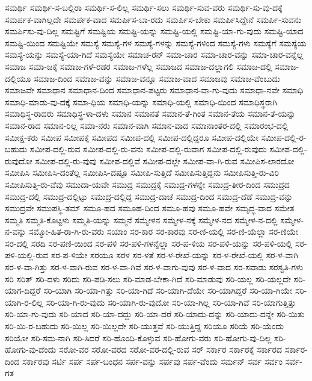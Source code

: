 {ಸಮರ್ಥಿ
ಸಮರ್ಥಿ-ಸ-ಬಲ್ಲಿರಾ
ಸಮರ್ಥಿ-ಸ-ಲಿಲ್ಲ
ಸಮರ್ಥಿ-ಸಲು
ಸಮರ್ಥಿ-ಸುವ-ವರು
ಸಮರ್ಥಿ-ಸು-ವು-ದಕ್ಕೆ
ಸಮರ್ಪಕ-ವಾಗಿಲ್ಲದೇ
ಸಮರ್ಪಕ-ವಾದ
ಸಮರ್ಪಿಸ-ಬಾ-ರದು
ಸಮರ್ಪಿಸ-ಬೇಕು
ಸಮರ್ಪಿಸಿದ್ದೇನೆ
ಸಮರ್ಪಿ-ಸುವನು
ಸಮರ್ಪಿಸು-ವು-ದಿಲ್ಲ
ಸಮಷ್ಟಿಗೆ
ಸಮಷ್ಟಿಯ
ಸಮಷ್ಟಿ-ಯನ್ನು
ಸಮಷ್ಟಿ-ಯಲ್ಲಿ
ಸಮಷ್ಟಿ-ಯಾ-ಗು-ವುದು
ಸಮಷ್ಟಿ-ಯಾದ
ಸಮಷ್ಟಿ-ಯಿಂದ
ಸಮಷ್ಟಿಯೇ
ಸಮಸ್ಯೆ
ಸಮಸ್ಯೆ-ಗಳ
ಸಮಸ್ಯೆ-ಗಳನ್ನು
ಸಮಸ್ಯೆ-ಗಳಿಂದ
ಸಮಸ್ಯೆ-ಗಳು
ಸಮಸ್ಯೆಗೆ
ಸಮಸ್ಯೆಯ
ಸಮಸ್ಯೆ-ಯನ್ನು
ಸಮಸ್ಯೆ-ಯಾ-ಗಿದೆ
ಸಮಸ್ಯೆಯೇ
ಸಮಾಚ-ರನ್
ಸಮಾ-ಚಾರ
ಸಮಾ-ಚಾರ-ವನ್ನು
ಸಮಾ-ಚಾರ-ವನ್ನೆಲ್ಲ
ಸಮಾಜ
ಸಮಾ-ಜಕ್ಕೆ
ಸಮಾಜ-ಗಳೆ-ರಡರ
ಸಮಾಜ-ಗಳೆಲ್ಲ
ಸಮಾಜದ
ಸಮಾಜ-ದಲ್ಲಾಗಲಿ
ಸಮಾಜ-ದಲ್ಲಿ
ಸಮಾಜ-ದಲ್ಲಿಯೂ
ಸಮಾಜ-ದಿಂದ
ಸಮಾಜ-ವನ್ನು
ಸಮಾಜ-ವನ್ನೂ
ಸಮಾಜ-ವಾದ
ಸಮಾಜವು
ಸಮಾಜ-ವೆಂಬುದು
ಸಮಾಜವೇ
ಸಮಾಧಾನ
ಸಮಾಧಾನ-ದಿಂದ
ಸಮಾಧಾನ-ಪಟ್ಟರು
ಸಮಾಧಾನ-ವಾ-ಗು-ವುದು
ಸಮಾಧಾ-ನವೇ
ಸಮಾಧಿ
ಸಮಾಧಿ-ಮಾಡು-ವು-ದಕ್ಕೆ
ಸಮಾ-ಧಿಯ
ಸಮಾಧಿ-ಯನ್ನು
ಸಮಾಧಿ-ಯಲ್ಲಿ
ಸಮಾಧಿ-ಯಿಂದ
ಸಮಾಧಿಸ್ಥರಾಗಿ
ಸಮಾಧಿಸ್ಥ-ರಾದರು
ಸಮಾಧಿಸ್ಥ-ಳಾ-ದಳು
ಸಮಾನ
ಸಮಾನತೆ
ಸಮಾನ-ತೆ-ಗಿಂತ
ಸಮಾನ-ತೆಯ
ಸಮಾನ-ತೆ-ಯನ್ನು
ಸಮಾನ-ರಾದ
ಸಮಾನ-ರಿಲ್ಲ
ಸಮಾ-ನರು
ಸಮಾನ-ವಾಗಿ
ಸಮಾನ-ವಾದ
ಸಮಾನಾಂತರ-ದಲ್ಲಿ
ಸಮಾರಂಭ-ದಲ್ಲಿ
ಸಮೀಕ್ಷ-ಕರು
ಸಮೀಪ
ಸಮೀಪಕ್ಕೆ
ಸಮೀಪದ
ಸಮೀಪ-ದಲ್ಲಿ
ಸಮೀಪ-ದಲ್ಲಿದ್ದರೂ
ಸಮೀಪ-ದಲ್ಲಿಯೇ
ಸಮೀಪ-ದಲ್ಲಿ-ರ-ಬಹುದು
ಸಮೀಪ-ದಲ್ಲಿ-ರುವ
ಸಮೀಪ-ದಲ್ಲಿ-ರು-ವನು
ಸಮೀಪ-ದಲ್ಲಿ-ರುವಾಗ
ಸಮೀಪ-ದಲ್ಲಿ-ರುವುದು
ಸಮೀಪ-ದಲ್ಲಿ-ರುವುದೋ
ಸಮೀಪ-ದಲ್ಲಿ-ರು-ವುವು
ಸಮೀಪ-ದಲ್ಲಿವೆ
ಸಮೀಪ-ದಲ್ಲೇ
ಸಮೀಪ-ವಾ-ಗಿ-ರುವ
ಸಮೀಪಿಸ-ಲಾರದೋ
ಸಮೀಪಿಸಿ
ಸಮೀಪಿಸಿ-ದಂತೆಲ್ಲ
ಸಮೀಪಿಸಿ-ದಷ್ಟೂ
ಸಮೀಪಿ-ಸುತ್ತಿದೆ
ಸಮೀಪಿಸುತ್ತಿದ್ದನು
ಸಮೀಪಿಸುತ್ತಿ-ರು-ವಿರಿ
ಸಮೀಪಿಸುತ್ತಿ-ರು-ವೆವು
ಸಮುದಾ-ಯವೇ
ಸಮುದ್ರ
ಸಮುದ್ರಕ್ಕೆ
ಸಮುದ್ರ-ಗಳನ್ನೇ
ಸಮುದ್ರ-ತೀರ-ದಿಂದ
ಸಮುದ್ರದ
ಸಮುದ್ರ-ದಲ್ಲಿ
ಸಮುದ್ರ-ದಲ್ಲಿಟ್ಟು
ಸಮುದ್ರ-ದಲ್ಲಿದ್ದ
ಸಮುದ್ರ-ದಾಚೆ
ಸಮುದ್ರ-ದಿಂದ
ಸಮುದ್ರ-ದೆಡೆ
ಸಮುದ್ರ-ವನ್ನು
ಸಮುದ್ರವೇ
ಸಮುಪಸ್ಥಿ-ತಮ್
ಸಮೂ-ಹದ
ಸಮೂಹ-ದಿಂದ
ಸಮೂ-ಹವು
ಸಮೂ-ಹವೇ
ಸಮೃದ್ಧ-ವಾದ
ಸಮೇತ
ಸಮ್ಮತಿ
ಸಮ್ಮತಿ-ಕೊಟ್ಟಳು
ಸಮ್ಮತಿ-ಯನ್ನು
ಸಮ್ಮನೆ
ಸಮ್ಮೇಳನ
ಸಮ್ಮೇಳ-ನಕ್ಕೆ
ಸಮ್ಮೇಳ-ನದ
ಸಮ್ಮೇಳ-ನ-ದಲ್ಲಿ
ಸಮ್ಮೇಳ-ನ-ವನ್ನು
ಸಮ್ಮೋ-ಹಿತ-ರಾ-ಗಿ-ರು-ವರು
ಸಯಾಂ
ಸರ-ಕಾರ
ಸರ-ಕಾರವು
ಸರ-ಣಿ-ಯಲ್ಲಿ
ಸರ-ಣಿ-ಯೆಲ್ಲಾ
ಸರ-ಣಿಯೇ
ಸರ-ದಲ್ಲಿ
ಸರದಿ
ಸರ-ಪಣಿ-ಯಿಂದ
ಸರ-ಪಳಿ
ಸರ-ಪಳಿ-ಗಳನ್ನೆಲ್ಲಾ
ಸರ-ಪ-ಳಿಯ
ಸರ-ಪಳಿ-ಯನ್ನು
ಸರ-ಪಳಿ-ಯಲ್ಲಿ
ಸರ-ಪಳಿ-ಯಲ್ಲಿ-ರುವ
ಸರ-ಪ-ಳಿಯೇ
ಸರಯೂ
ಸರಳ
ಸರ-ಳತೆ
ಸರ-ಳ-ರೇಖೆ-ಯನ್ನು
ಸರ-ಳ-ರೇಖೆ-ಯಲ್ಲಿ
ಸರ-ಳ-ವಾಗಿ
ಸರ-ಳ-ವಾ-ಗಿತ್ತು
ಸರ-ಳ-ವಾಗಿ-ರುವ
ಸರ-ಳ-ವಾ-ಗಿವೆ
ಸರ-ಳ-ವಾಗು-ವುವು
ಸರ-ಳ-ವಾದ
ಸರ-ಸವಾಡು
ಸರಸ್ವತಿ-ಗಳು
ಸರಿ
ಸರಿತ್
ಸರಿ-ದಳು
ಸರಿದು
ಸರಿ-ಪಡಿ-ಸಲು
ಸರಿ-ಮಾಡ-ಬೇಕಾ-ಗಿದೆ
ಸರಿ-ಮಾಡುವು
ಸರಿ-ಯಲ್ಲ
ಸರಿ-ಯಲ್ಲದೇ
ಸರಿ-ಯಾಗ-ದಿದ್ದರೆ
ಸರಿ-ಯಾಗಿ
ಸರಿ-ಯಾ-ಗಿತ್ತು
ಸರಿ-ಯಾ-ಗಿದೆ
ಸರಿ-ಯಾಗಿ-ದೆಯೇ
ಸರಿ-ಯಾಗಿದ್ದರೆ
ಸರಿ-ಯಾ-ಗಿಯೇ
ಸರಿ-ಯಾಗಿ-ರ-ಲಿಲ್ಲ
ಸರಿ-ಯಾ-ಗಿ-ರು-ವುದು
ಸರಿ-ಯಾಗಿ-ರು-ವುದೋ
ಸರಿ-ಯಾ-ಗಿಲ್ಲ
ಸರಿ-ಯಾ-ಗಿವೆ
ಸರಿ-ಯಾಗುತ್ತಿತ್ತು
ಸರಿ-ಯಾ-ಗು-ವುದು
ಸರಿ-ಯಾದ
ಸರಿ-ಯಾ-ದದ್ದು
ಸರಿ-ಯಾ-ದರೆ
ಸರಿ-ಯಾದು-ದನ್ನು
ಸರಿ-ಯಾದು-ದನ್ನೇ
ಸರಿ-ಯಿತು
ಸರಿ-ಯಿ-ರ-ಬಹುದು
ಸರಿ-ಯಿಲ್ಲ
ಸರಿ-ಯಿಲ್ಲದೇ
ಸರಿ-ಯುತ್ತವೆ
ಸರಿ-ಯುತ್ತಿದ್ದ
ಸರಿಯೂ
ಸರಿಯೆ
ಸರಿ-ಯೆಂದು
ಸರಿಯೋ
ಸರಿ-ಸಮ-ನಾಗಿ
ಸರಿ-ಸಿದರೆ
ಸರಿ-ಹೊಂದಿ-ಕೊಳ್ಳುವ
ಸರಿ-ಹೋಗು-ವರು
ಸರಿ-ಹೋಗು-ವು-ದಿಲ್ಲ
ಸರಿ-ಹೋಗು-ವು-ದೆಂದು
ಸರೋ-ವರ
ಸರೋ-ವರದ
ಸರೋ-ವರ-ದಲ್ಲಿ-ರುವ
ಸರ್
ಸರ್ಕಾರ
ಸರ್ಕಾರಕ್ಕೆ
ಸರ್ಕಾರದ
ಸರ್ಕಾರ-ದಿಂದ
ಸರ್ಕಾರವು
ಸರ್ಟಿ
ಸರ್ಪ
ಸರ್ಪ-ಬಂಧನ
ಸರ್ಪ-ವನ್ನು
ಸರ್ಪವು
ಸರ್ಪ-ವೆಂದು
ಸರ್ಮನ್
ಸರ್ವ
ಸರ್ವಂ
ಸರ್ವ-ಗತ
}
